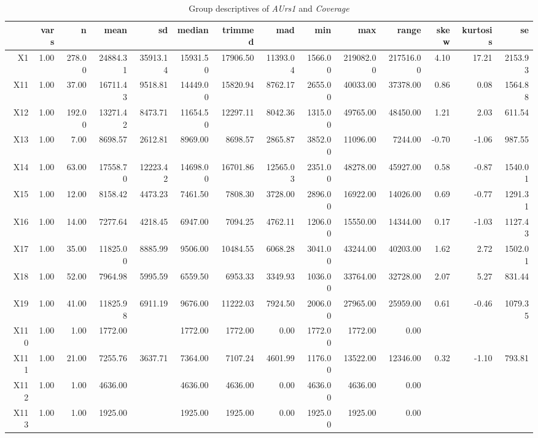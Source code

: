 \begin{table}[ht]
	\small
	\centering
	\begin{tabular}{rrrrrrrrrrrrrr}
		\hline
	   & vars & n & mean & sd & median & trimmed & mad & min & max & range & skew & kurtosis & se \\ 
		\hline
	  X1 & 1.00 & 278.00 & 24884.31 & 35913.14 & 15931.50 & 17906.50 & 11393.04 & 1566.00 & 219082.00 & 217516.00 & 4.10 & 17.21 & 2153.93 \\ 
		X11 & 1.00 & 37.00 & 16711.43 & 9518.81 & 14449.00 & 15820.94 & 8762.17 & 2655.00 & 40033.00 & 37378.00 & 0.86 & 0.08 & 1564.88 \\ 
		X12 & 1.00 & 192.00 & 13271.42 & 8473.71 & 11654.50 & 12297.11 & 8042.36 & 1315.00 & 49765.00 & 48450.00 & 1.21 & 2.03 & 611.54 \\ 
		X13 & 1.00 & 7.00 & 8698.57 & 2612.81 & 8969.00 & 8698.57 & 2865.87 & 3852.00 & 11096.00 & 7244.00 & -0.70 & -1.06 & 987.55 \\ 
		X14 & 1.00 & 63.00 & 17558.70 & 12223.42 & 14698.00 & 16701.86 & 12565.03 & 2351.00 & 48278.00 & 45927.00 & 0.58 & -0.87 & 1540.01 \\ 
		X15 & 1.00 & 12.00 & 8158.42 & 4473.23 & 7461.50 & 7808.30 & 3728.00 & 2896.00 & 16922.00 & 14026.00 & 0.69 & -0.77 & 1291.31 \\ 
		X16 & 1.00 & 14.00 & 7277.64 & 4218.45 & 6947.00 & 7094.25 & 4762.11 & 1206.00 & 15550.00 & 14344.00 & 0.17 & -1.03 & 1127.43 \\ 
		X17 & 1.00 & 35.00 & 11825.00 & 8885.99 & 9506.00 & 10484.55 & 6068.28 & 3041.00 & 43244.00 & 40203.00 & 1.62 & 2.72 & 1502.01 \\ 
		X18 & 1.00 & 52.00 & 7964.98 & 5995.59 & 6559.50 & 6953.33 & 3349.93 & 1036.00 & 33764.00 & 32728.00 & 2.07 & 5.27 & 831.44 \\ 
		X19 & 1.00 & 41.00 & 11825.98 & 6911.19 & 9676.00 & 11222.03 & 7924.50 & 2006.00 & 27965.00 & 25959.00 & 0.61 & -0.46 & 1079.35 \\ 
		X110 & 1.00 & 1.00 & 1772.00 &  & 1772.00 & 1772.00 & 0.00 & 1772.00 & 1772.00 & 0.00 &  &  &  \\ 
		X111 & 1.00 & 21.00 & 7255.76 & 3637.71 & 7364.00 & 7107.24 & 4601.99 & 1176.00 & 13522.00 & 12346.00 & 0.32 & -1.10 & 793.81 \\ 
		X112 & 1.00 & 1.00 & 4636.00 &  & 4636.00 & 4636.00 & 0.00 & 4636.00 & 4636.00 & 0.00 &  &  &  \\ 
		X113 & 1.00 & 1.00 & 1925.00 &  & 1925.00 & 1925.00 & 0.00 & 1925.00 & 1925.00 & 0.00 &  &  &  \\ 
		 \hline
	  \end{tabular}
    \caption{Group descriptives of \textit{AUrs1} and \textit{Coverage}}
    \label{tbl:descriptives_baysis_initiator_AUrs1_Cov}
\end{table}
